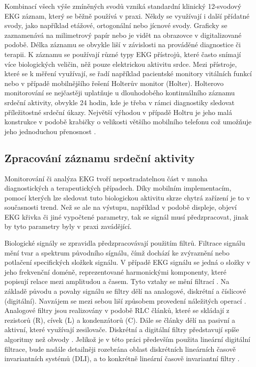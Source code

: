 Kombinací všech výše zmíněných svodů vzniká standardní klinický 12-svodový EKG
záznam, který se běžně používá v praxi. Někdy se využívají i další přídatné
svody, jako například etážové, ortogonální nebo jícnové svody. Graficky se
zaznamenává na milimetrový papír nebo je vidět na obrazovce v digitalizované
podobě. Délka záznamu se obvykle liší v závislosti na prováděné diagnostice či
terapii. K záznamu se používají různé typy EKG přístrojů, které často snímají
více biologických veličin, něž pouze elektrickou aktivitu srdce. Mezi přístroje,
které se k měření využívají, se řadí například pacientské monitory vitálních
funkcí nebo v případě mobilnějšího řešení Holterův monitor (Holter). Holterovo
monitorování se nejčastěji uplatňuje u dlouhodobého kontinuálního záznamu
srdeční aktivity, obvykle 24 hodin, kde je třeba v rámci diagnostiky sledovat
příležitostné srdeční úkazy. Největší výhodou v případě Holtru je jeho malá
konstrukce v podobě krabičky o velikosti většího mobilního telefonu což umožňuje
jeho jednoduchou přenosnost \cite{Surawicz2008}.

\subsection{Zpracování záznamu srdeční aktivity}
Monitorování či analýza EKG tvoří nepostradatelnou část v mnoha diagnostických a
terapeutických případech. Díky mobilním implementacím, pomocí kterých lze
sledovat tuto biologickou aktivitu skrze chytrá zařízení je to v současnosti
trend. Než se ale na výstupu, například v podobě displeje, objeví EKG křivka či
jiné vypočtené parametry, tak se signál musí předzpracovat, jinak by tyto
parametry byly v praxi zavádějící.

Biologické signály se zpravidla předzpracovávají použitím filtrů. Filtrace
signálu mění tvar a spektrum původního sígnálu, čímž dochází ke zvýraznění nebo
potlačení specifických složkek signálu. V případě EKG signálu se jedná o složky
v jeho frekvenční doméně, reprezentované harmonickými komponenty, které popisují
relace mezi amplitudou a časem. Tyto vztahy se mění filtrací \cite{Jan2002}. Na
základě původu a povahy signálu se filtry dělí na analogové, diskrétní a
číslicové (digitální). Navzájem se mezi sebou liší způsobem provedení náležitých
operací \cite{Skop1994}. Analogové filtry jsou realizovány v podobě RLC článků,
které se skládají z rezistorů (R), cívek (L) a kondenzátorů (C). Dále se články
dělí na pasivní a aktivní, které využívají zesilovače. Diskrétní a digitální
filtry představují spíše algoritmy než obvody \cite{Prchal2000}. Jelikož je v
této práci především použita lineární digitální filtrace, bude nadále detailněji
rozebrána oblast diskrétních lineárních časově invariantních systémů (DLI), a to
konkrétně lineární časově invariantní filtry \cite{Jan2002}.

